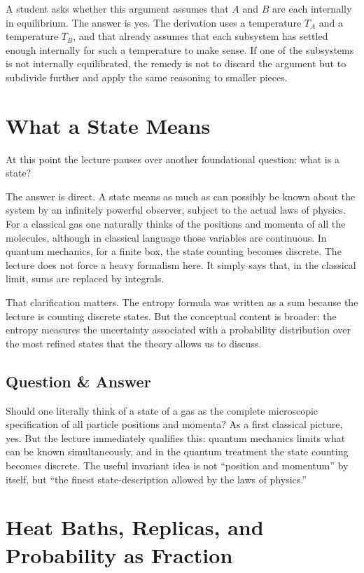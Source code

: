 A student asks whether this argument assumes that \(A\) and \(B\) are each internally in equilibrium. The answer is yes. The derivation uses a temperature \(T_A\) and a temperature \(T_B\), and that already assumes that each subsystem has settled enough internally for such a temperature to make sense. If one of the subsystems is not internally equilibrated, the remedy is not to discard the argument but to subdivide further and apply the same reasoning to smaller pieces.

\section{What a State Means}

At this point the lecture pauses over another foundational question: what is a state?

The answer is direct. A state means as much as can possibly be known about the system by an infinitely powerful observer, subject to the actual laws of physics. For a classical gas one naturally thinks of the positions and momenta of all the molecules, although in classical language those variables are continuous. In quantum mechanics, for a finite box, the state counting becomes discrete. The lecture does not force a heavy formalism here. It simply says that, in the classical limit, sums are replaced by integrals.

That clarification matters. The entropy formula was written as a sum because the lecture is counting discrete states. But the conceptual content is broader: the entropy measures the uncertainty associated with a probability distribution over the most refined states that the theory allows us to discuss.

\subsection{Question \& Answer}

Should one literally think of a state of a gas as the complete microscopic specification of all particle positions and momenta? As a first classical picture, yes. But the lecture immediately qualifies this: quantum mechanics limits what can be known simultaneously, and in the quantum treatment the state counting becomes discrete. The useful invariant idea is not ``position and momentum'' by itself, but ``the finest state-description allowed by the laws of physics.''

\section{Heat Baths, Replicas, and Probability as Fraction}

